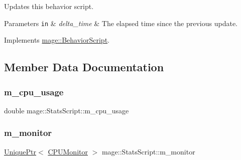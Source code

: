 Updates this behavior script.


\begin{DoxyParams}[1]{Parameters}
\mbox{\tt in}  & {\em delta\+\_\+time} & The elapsed time since the previous update. \\
\hline
\end{DoxyParams}


Implements \hyperlink{classmage_1_1_behavior_script_a905b6c83640cb91d19fecab3435f6feb}{mage\+::\+Behavior\+Script}.



\subsection{Member Data Documentation}
\hypertarget{classmage_1_1_stats_script_ae10409f1268280ed8b6f78ef23b87c5e}{}\label{classmage_1_1_stats_script_ae10409f1268280ed8b6f78ef23b87c5e} 
\subsubsection{\texorpdfstring{m\+\_\+cpu\+\_\+usage}{m\_cpu\_usage}}
{\footnotesize\ttfamily double mage\+::\+Stats\+Script\+::m\+\_\+cpu\+\_\+usage\hspace{0.3cm}{\ttfamily [private]}}

\hypertarget{classmage_1_1_stats_script_a12e321d8fe1003de3643c4b799dd4c8f}{}\label{classmage_1_1_stats_script_a12e321d8fe1003de3643c4b799dd4c8f} 
\subsubsection{\texorpdfstring{m\+\_\+monitor}{m\_monitor}}
{\footnotesize\ttfamily \hyperlink{namespacemage_a8c307fbcc33bce9b7f2aa4c26c3b95cf}{Unique\+Ptr}$<$ \hyperlink{classmage_1_1_c_p_u_monitor}{C\+P\+U\+Monitor} $>$ mage\+::\+Stats\+Script\+::m\+\_\+monitor\hspace{0.3cm}{\ttfamily [private]}}

\hypertarget{classmage_1_1_stats_script_ae0c904d5b3406a20892978a83bf2fa8c}{}\label{classmage_1_1_stats_script_ae0c904d5b3406a20892978a83bf2fa8c} 
